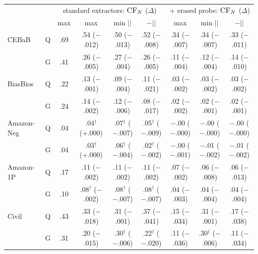 \begin{tabular}{@{}ll|cccc|ccc@{}}
\toprule
 & & \multicolumn{4}{c|}{standard extractors: $\textsc{CF}_{N}$ ($\Delta$\dec{})} & \multicolumn{3}{c}{+ erased probe: $\textsc{CF}_{N}$ ($\Delta$\dec{})} \\
 & & max \dec{} & max \conf{} & min $|$\leak{}$|$ & \dec{}$-|$\leak{}$|$ & max \conf{} & min $|$\leak{}$|$ & \dec{}$-|$\leak{}$|$ \\
\midrule
CEBaB & Q & .69 & .54 ($-$.012) & .50 ($-$.013) & .52 ($-$.008) & .34 ($-$.007) & .34 ($-$.007) & .33 ($-$.011) \\
 & G & .41 & .26 ($-$.005) & .27 ($-$.004) & .26 ($-$.005) & .11 ($-$.004) & .12 ($-$.004) & .14 ($-$.010) \\
BiasBios & Q & .22 & .13 ($-$.001) & .09 ($-$.004) & .11 ($-$.021) & .03 ($-$.002) & .03 ($-$.002) & .03 ($-$.002) \\
 & G & .24 & .14 ($-$.002) & .12 ($-$.006) & .08 ($-$.017) & .02 ($-$.002) & .02 ($-$.001) & .02 ($-$.001) \\
Amazon-Neg & Q & .04 & .04$^\dagger$ (+.000) & .07$^\dagger$ ($-$.007) & .05$^\dagger$ ($-$.009) & $-$.00 ($-$.000) & $-$.00 ($-$.000) & $-$.00 ($-$.000) \\
 & G & .04 & .03$^\dagger$ (+.000) & .06$^\dagger$ ($-$.004) & .02$^\dagger$ ($-$.002) & $-$.00 ($-$.001) & $-$.01 ($-$.002) & $-$.01 ($-$.002) \\
Amazon-1P & Q & .17 & .11 ($-$.002) & .11 ($-$.002) & .11 ($-$.002) & .07 ($-$.002) & .06 ($-$.008) & .06 ($-$.013) \\
 & G & .10 & .08$^\dagger$ ($-$.002) & .08$^\dagger$ ($-$.007) & .08$^\dagger$ ($-$.007) & .04 ($-$.003) & .04 ($-$.004) & .04 ($-$.004) \\
Civil & Q & .43 & .33 ($-$.018) & .31 ($-$.001) & .37 ($-$.041) & .15 ($-$.034) & .31 ($-$.001) & .17 ($-$.038) \\
 & G & .31 & .20 ($-$.015) & .30$^\dagger$ ($-$.006) & .22$^\dagger$ ($-$.020) & .11 ($-$.036) & .30$^\dagger$ ($-$.006) & .11 ($-$.034) \\
\bottomrule
\end{tabular}
